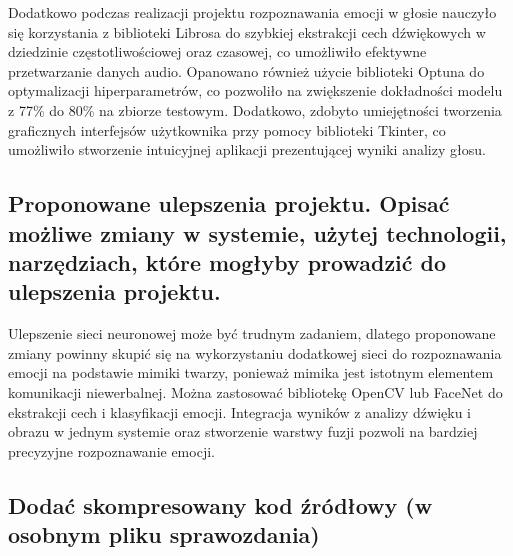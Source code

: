 \documentclass[12pt,titlepage]{article}
\begin{document}
Dodatkowo podczas realizacji projektu rozpoznawania emocji w głosie nauczyło się korzystania z biblioteki Librosa do szybkiej ekstrakcji cech dźwiękowych w dziedzinie częstotliwościowej oraz czasowej, co umożliwiło efektywne przetwarzanie danych audio. Opanowano również użycie biblioteki Optuna do optymalizacji hiperparametrów, co pozwoliło na zwiększenie dokładności modelu z 77\% do 80\% na zbiorze testowym. Dodatkowo, zdobyto umiejętności tworzenia graficznych interfejsów użytkownika przy pomocy biblioteki Tkinter, co umożliwiło stworzenie intuicyjnej aplikacji prezentującej wyniki analizy głosu.

\subsection{Proponowane ulepszenia projektu. Opisać możliwe zmiany w systemie, użytej technologii, narzędziach, które mogłyby prowadzić do ulepszenia projektu.}
Ulepszenie sieci neuronowej może być trudnym zadaniem, dlatego proponowane zmiany powinny skupić się na wykorzystaniu dodatkowej sieci do rozpoznawania emocji na podstawie mimiki twarzy, ponieważ mimika jest istotnym elementem komunikacji niewerbalnej. Można zastosować bibliotekę OpenCV lub FaceNet do ekstrakcji cech i klasyfikacji emocji. Integracja wyników z analizy dźwięku i obrazu w jednym systemie oraz stworzenie warstwy fuzji pozwoli na bardziej precyzyjne rozpoznawanie emocji.
\subsection{Dodać skompresowany kod źródłowy (w osobnym pliku sprawozdania)}
\end{document}
